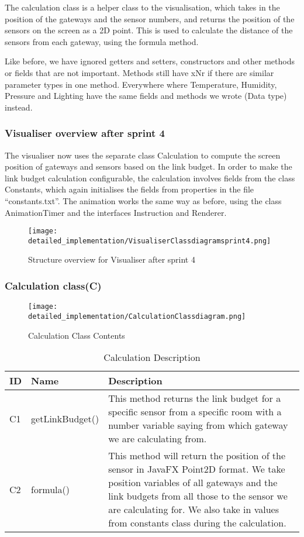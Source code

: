 \documentclass[../document]{subfiles}
\begin{document}
The calculation class is a helper class to the visualisation, which takes in the position of the gateways and the sensor numbers, and returns the position of the sensors on the screen as a 2D point. This is used to calculate the distance of the sensors from each gateway, using the formula method.

Like before, we have ignored getters and setters, constructors and other methods or fields that are not important. Methods still have xNr if there are similar parameter types in one method. Everywhere where Temperature, Humidity, Pressure and Lighting have the same fields and methods we wrote (Data type) instead.

\subsubsection{Visualiser overview after sprint 4}

The visualiser now uses the separate class Calculation to compute the screen position of gateways and sensors based on the link budget. In order to make the link budget calculation configurable, the calculation involves fields from the class Constants, which again initialises the fields from properties in the file “constants.txt”. The animation works the same way as before, using the class AnimationTimer and the interfaces Instruction and Renderer.

\begin{figure}[H]
\centering
\texttt{[image: detailed\_implementation/VisualiserClassdiagramsprint4.png]}
\caption{Structure overview for Visualiser after sprint 4}
\end{figure}

\subsubsection{Calculation class(C)}

\begin{figure}[H]
\centering
\texttt{[image: detailed\_implementation/CalculationClassdiagram.png]}
\caption{Calculation Class Contents}
\end{figure}

\begin{table}[H]
\caption{Calculation Description}
\centering
\begin{tabularx}{\textwidth}{|L{1.2cm}|L{3.5cm}|X|}
\hline ID
&Name
&Description
\\ \hline C1
&getLinkBudget()
&This method returns the link budget for a specific sensor from a specific room with a number variable saying from which gateway we are calculating from.
\\ \hline C2
&formula()
&This method will return the position of the sensor in \gls{JavaFX} Point2D format. We take position variables of all gateways and the link budgets from all those to the sensor we are calculating for. We also take in values from constants class during the calculation.
\\ \hline 
\end{tabularx}
\end{table}
\end{document}
